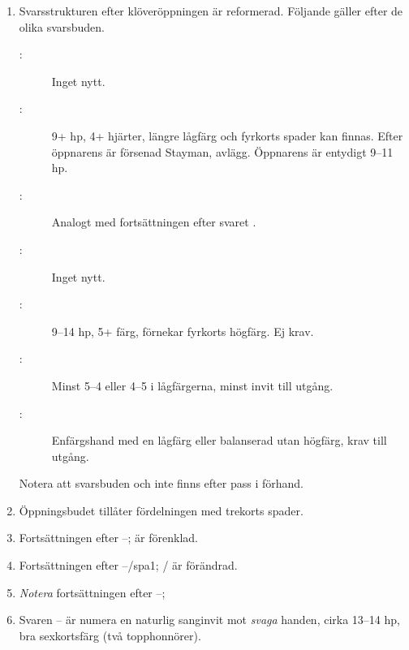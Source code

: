 \begin{enumerate}
\item Svarsstrukturen efter klöveröppningen är reformerad. Följande gäller
  efter de olika svarsbuden.
\begin{description}
\item[:] Inget nytt.
\item[:] 9+ hp, 4+ hjärter, längre lågfärg och fyrkorts spader kan
  finnas. Efter öppnarens  är  försenad Stayman,  avlägg. 
Öppnarens  är entydigt 9--11 hp.
\item[:] Analogt med fortsättningen efter svaret .
\item[:] Inget nytt.
\item[:] 9--14 hp, 5+ färg, förnekar fyrkorts högfärg. Ej krav.
\item[:] Minst 5--4 eller 4--5 i lågfärgerna, minst invit till utgång.
\item[:] Enfärgshand med en lågfärg eller balanserad utan högfärg,
  krav till utgång.
\end{description}
Notera att svarsbuden  och  inte finns efter pass i förhand.

\item Öppningsbudet  tillåter fördelningen  med
  trekorts spader.

\item Fortsättningen efter --;  är förenklad.

\item Fortsättningen efter --/spa{1}; / är förändrad.

\item \emph{Notera} fortsättningen efter --; 

\item Svaren -- är numera en naturlig sanginvit mot
  \emph{svaga} handen, cirka 13--14 hp, bra sexkortsfärg (två topphonnörer).
\end{enumerate}
